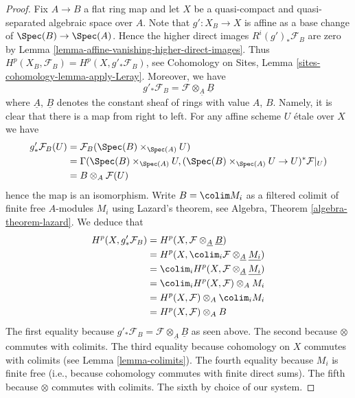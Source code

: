\begin{proof}
\medskip\noindent
Fix $A \to B$ a flat ring map and let $X$ be a quasi-compact and
quasi-separated algebraic space over $A$. Note that $g' : X_B \to X$
is affine as a base change of $\Spec(B) \to \Spec(A)$. Hence
the higher direct images $R^i(g')_*\mathcal{F}_B$ are zero by
Lemma \ref{lemma-affine-vanishing-higher-direct-images}.
Thus $H^p(X_B, \mathcal{F}_B) = H^p(X, g'_*\mathcal{F}_B)$, see
Cohomology on Sites, Lemma \ref{sites-cohomology-lemma-apply-Leray}.
Moreover, we have
$$
g'_*\mathcal{F}_B = \mathcal{F} \otimes_{\underline{A}} \underline{B}
$$
where $\underline{A}$, $\underline{B}$ denotes the constant sheaf of
rings with value $A$, $B$. Namely, it is clear that there is a map
from right to left. For any affine scheme $U$ \'etale over $X$ we have
\begin{align*}
g'_*\mathcal{F}_B(U) & = \mathcal{F}_B(\Spec(B) \times_{\Spec(A)} U) \\
& =
\Gamma(\Spec(B) \times_{\Spec(A)} U,
(\Spec(B) \times_{\Spec(A)} U \to U)^*\mathcal{F}|_U) \\
& =
B \otimes_A \mathcal{F}(U)
\end{align*}
hence the map is an isomorphism. Write $B = \colim M_i$ as a filtered
colimit of finite free $A$-modules $M_i$ using Lazard's theorem, see
Algebra, Theorem \ref{algebra-theorem-lazard}.
We deduce that
\begin{align*}
H^p(X, g'_*\mathcal{F}_B) &
= H^p(X, \mathcal{F} \otimes_{\underline{A}} \underline{B}) \\
& = H^p(X, \colim_i \mathcal{F} \otimes_{\underline{A}} \underline{M_i}) \\
& = \colim_i H^p(X, \mathcal{F} \otimes_{\underline{A}} \underline{M_i}) \\
& = \colim_i H^p(X, \mathcal{F}) \otimes_A M_i \\
& = H^p(X, \mathcal{F}) \otimes_A \colim_i M_i \\
& = H^p(X, \mathcal{F}) \otimes_A B
\end{align*}
The first equality because
$g'_*\mathcal{F}_B = \mathcal{F} \otimes_{\underline{A}} \underline{B}$
as seen above.
The second because $\otimes$ commutes with colimits.
The third equality because cohomology on $X$ commutes with
colimits (see
Lemma \ref{lemma-colimits}).
The fourth equality because $M_i$ is finite free (i.e., because cohomology
commutes with finite direct sums).
The fifth because $\otimes$ commutes with colimits.
The sixth by choice of our system.
\end{proof}

